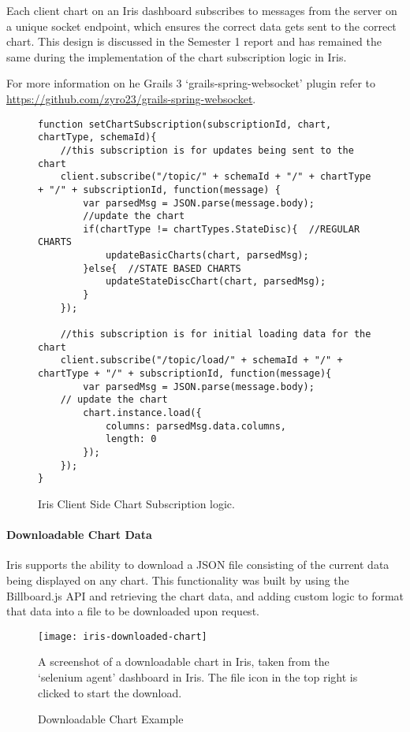 \documentclass[12pt,a4paper,titlepage]{report}
\begin{document}
Each client chart on an Iris dashboard subscribes to messages from the server on a unique socket endpoint, which ensures the correct data gets sent to the correct chart. This design is discussed in the Semester 1 report and has remained the same during the implementation of the chart subscription logic in Iris.

For more information on he Grails 3 `grails-spring-websocket' plugin refer to \url{https://github.com/zyro23/grails-spring-websocket}.
\begin{figure}[H]
\begin{tcolorbox}
\begin{verbatim}
function setChartSubscription(subscriptionId, chart, chartType, schemaId){
    //this subscription is for updates being sent to the chart
    client.subscribe("/topic/" + schemaId + "/" + chartType + "/" + subscriptionId, function(message) {
        var parsedMsg = JSON.parse(message.body);
        //update the chart
        if(chartType != chartTypes.StateDisc){  //REGULAR CHARTS
            updateBasicCharts(chart, parsedMsg);
        }else{  //STATE BASED CHARTS
            updateStateDiscChart(chart, parsedMsg);
        }
    });

    //this subscription is for initial loading data for the chart
    client.subscribe("/topic/load/" + schemaId + "/" + chartType + "/" + subscriptionId, function(message){
        var parsedMsg = JSON.parse(message.body);
    // update the chart
        chart.instance.load({
            columns: parsedMsg.data.columns,
            length: 0
        });
    });
}
\end{verbatim}
\end{tcolorbox}
\caption{Iris Client Side Chart Subscription logic.}
\end{figure}

\paragraph{Downloadable Chart Data}

Iris supports the ability to download a JSON file consisting of the current data being displayed on any chart. This functionality was built by using the Billboard.js API and retrieving the chart data, and adding custom logic to format that data into a file to be downloaded upon request.
\begin{figure}[H]
\begin{tcolorbox}
\begin{center}
\texttt{[image: iris-downloaded-chart]}
\end{center}
A screenshot of a downloadable chart in Iris, taken from the `selenium agent' dashboard in Iris. The file icon in the top right is clicked to start the download.
\end{tcolorbox}
\caption{Downloadable Chart Example}
\label{fig:downloaded:chart}
\end{figure}
\end{document}
